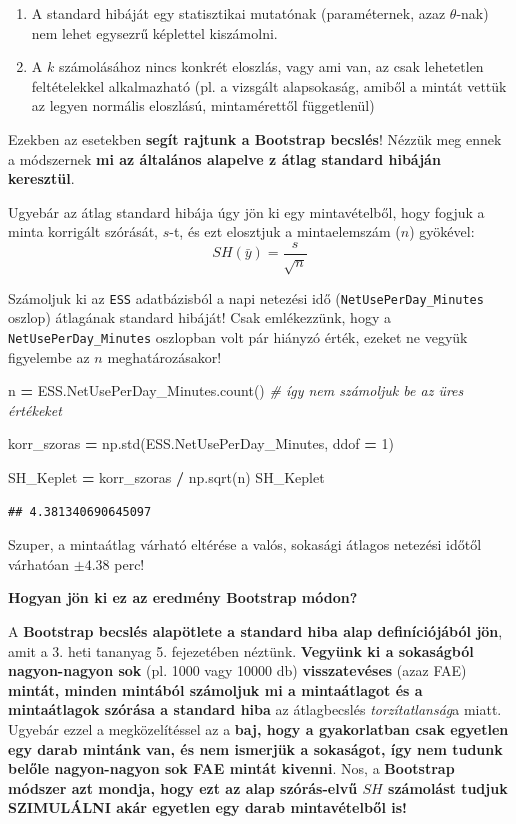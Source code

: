 \documentclass[
]{book}
\newenvironment{Shaded}{\begin{snugshade}}{\end{snugshade}}
\newcommand{\CommentTok}[1]{\textcolor[rgb]{0.56,0.35,0.01}{\textit{#1}}}
\newcommand{\DecValTok}[1]{\textcolor[rgb]{0.00,0.00,0.81}{#1}}
\newcommand{\NormalTok}[1]{#1}
\newcommand{\OperatorTok}[1]{\textcolor[rgb]{0.81,0.36,0.00}{\textbf{#1}}}
\providecommand{\tightlist}{%
  \setlength{\itemsep}{0pt}\setlength{\parskip}{0pt}}
\begin{document}
\begin{enumerate}
\def\labelenumi{\arabic{enumi}.}
\tightlist
\item
  A standard hibáját egy statisztikai mutatónak (paraméternek, azaz \(\theta\)-nak) nem lehet egysezrű képlettel kiszámolni.
\item
  A \(k\) számolásához nincs konkrét eloszlás, vagy ami van, az csak lehetetlen feltételekkel alkalmazható (pl. a vizsgált alapsokaság, amiből a mintát vettük az legyen normális eloszlású, mintamérettől függetlenül)
\end{enumerate}

Ezekben az esetekben \textbf{segít rajtunk a Bootstrap becslés}! Nézzük meg ennek a módszernek \textbf{mi az általános alapelve z átlag standard hibáján keresztül}.

Ugyebár az átlag standard hibája úgy jön ki egy mintavételből, hogy fogjuk a minta korrigált szórását, \(s\)-t, és ezt elosztjuk a mintaelemszám (\(n\)) gyökével: \[SH(\bar{y})=\frac{s}{\sqrt{n}}\]

Számoljuk ki az \texttt{ESS} adatbázisból a napi netezési idő (\texttt{NetUsePerDay\_Minutes} oszlop) átlagának standard hibáját! Csak emlékezzünk, hogy a \texttt{NetUsePerDay\_Minutes} oszlopban volt pár hiányzó érték, ezeket ne vegyük figyelembe az \(n\) meghatározásakor!

\begin{Shaded}
\begin{Highlighting}[]
\NormalTok{n }\OperatorTok{=}\NormalTok{ ESS.NetUsePerDay\_Minutes.count() }\CommentTok{\# így nem számoljuk be az üres értékeket}

\NormalTok{korr\_szoras }\OperatorTok{=}\NormalTok{ np.std(ESS.NetUsePerDay\_Minutes, ddof }\OperatorTok{=} \DecValTok{1}\NormalTok{)}

\NormalTok{SH\_Keplet }\OperatorTok{=}\NormalTok{ korr\_szoras }\OperatorTok{/}\NormalTok{ np.sqrt(n)}
\NormalTok{SH\_Keplet}
\end{Highlighting}
\end{Shaded}

\begin{verbatim}
## 4.381340690645097
\end{verbatim}

Szuper, a mintaátlag várható eltérése a valós, sokasági átlagos netezési időtől várhatóan \(\pm4.38\) perc!

\textbf{Hogyan jön ki ez az eredmény Bootstrap módon?}

A \textbf{Bootstrap becslés alapötlete a standard hiba alap definíciójából jön}, amit a 3. heti tananyag 5. fejezetében néztünk. \textbf{Vegyünk ki a sokaságból nagyon-nagyon sok} (pl. 1000 vagy 10000 db) \textbf{visszatevéses} (azaz FAE) \textbf{mintát, minden mintából számoljuk mi a mintaátlagot és a mintaátlagok szórása a standard hiba} az átlagbecslés \emph{torzítatlanság}a miatt.
Ugyebár ezzel a megközelítéssel az a \textbf{baj, hogy a gyakorlatban csak egyetlen egy darab mintánk van, és nem ismerjük a sokaságot, így nem tudunk belőle nagyon-nagyon sok FAE mintát kivenni}.
Nos, a \textbf{Bootstrap módszer azt mondja, hogy ezt az alap szórás-elvű \(SH\) számolást tudjuk SZIMULÁLNI akár egyetlen egy darab mintavételből is!}
\end{document}
